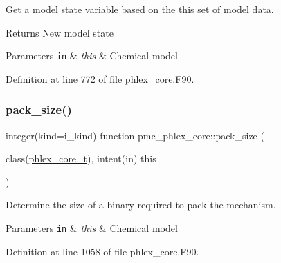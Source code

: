 Get a model state variable based on the this set of model data. 

\begin{DoxyReturn}{Returns}
New model state
\end{DoxyReturn}

\begin{DoxyParams}[1]{Parameters}
\mbox{\tt in}  & {\em this} & Chemical model \\
\hline
\end{DoxyParams}


Definition at line 772 of file phlex\+\_\+core.\+F90.

\mbox{\label{namespacepmc__phlex__core_acc35bccfc7c3e9afcac4c02ef70603c4}} 
\subsubsection{\texorpdfstring{pack\+\_\+size()}{pack\_size()}}
{\footnotesize\ttfamily integer(kind=i\+\_\+kind) function pmc\+\_\+phlex\+\_\+core\+::pack\+\_\+size (\begin{DoxyParamCaption}\item[{class(\mbox{\hyperlink{structpmc__phlex__core_1_1phlex__core__t}{phlex\+\_\+core\+\_\+t}}), intent(in)}]{this }\end{DoxyParamCaption})}



Determine the size of a binary required to pack the mechanism. 


\begin{DoxyParams}[1]{Parameters}
\mbox{\tt in}  & {\em this} & Chemical model \\
\hline
\end{DoxyParams}


Definition at line 1058 of file phlex\+\_\+core.\+F90.

\mbox{\label{namespacepmc__phlex__core_ad11997713c2b007cafdbe7aa2b4a8c6a}} 
